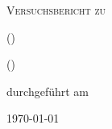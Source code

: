 
\makeatletter
\newcommand*{\protokollemailparse}[1]{%
	\@for\@tempa:=#1\do{%
		\normalsize\email{\@tempa}\\
	}%
}
\makeatother

\begin{titlepage}
	\centering
	{\scshape\LARGE Versuchsbericht zu \par}
	\vspace{1cm}
	{\scshape\huge \varName\par}
	\vspace{2.5cm}
	{\LARGE \varGruppe\par}
	\vspace{0.5cm}
	{\large \varNameA {} (\varEmailA) \par}
	{\large \varNameB {} (\varEmailB) \par}
	\vfill
	durchgeführt am \varDatum\par
	{\large \varBetreuer}
	\vfill
	{\large \today\par}
\end{titlepage}


\maketitle
